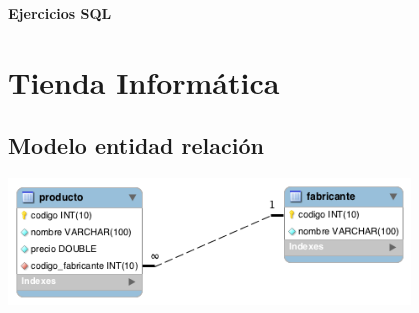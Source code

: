 \documentclass[12pt, letterpaper]{article}
\begin{document}
    \begin{titlepage}
        \centering
        {\bfseries\LARGE Ejercicios SQL}\par
        {}
    \end{titlepage}

    \tableofcontents

    \newpage

    \section{Tienda Informática}
    \subsection{Modelo entidad relación}
    \includegraphics[width=0.8\textwidth,height=0.8\textheight,keepaspectratio]{assets/entidad-relacion.png}
\end{document}
